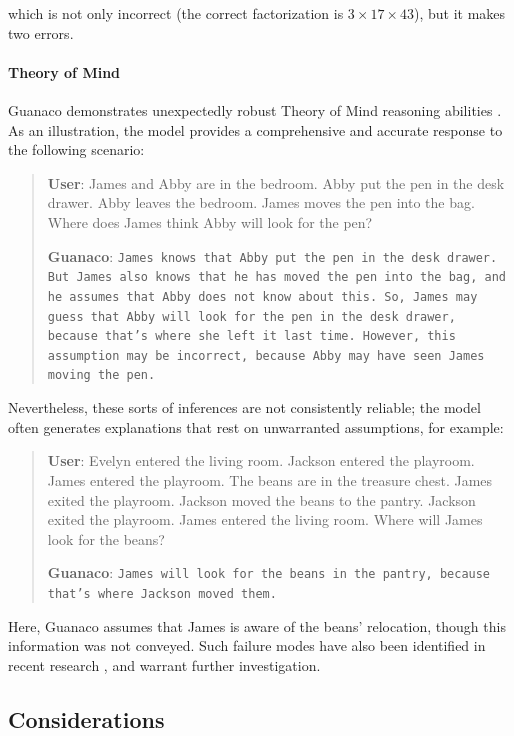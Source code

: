 which is not only incorrect (the correct factorization is $3 \times 17 \times 43$), but it makes two errors.

\paragraph{Theory of Mind} {Guanaco} demonstrates unexpectedly robust Theory of Mind reasoning abilities \cite{nematzadeh2018evaluating, sap2022neural}. As an illustration, the model provides a comprehensive and accurate response to the following scenario:

\begin{quote}
    \textbf{User}: James and Abby are in the bedroom. Abby put the pen in the desk drawer. Abby leaves the bedroom. James moves the pen into the bag. Where does James think Abby will look for the pen?

    \textbf{Guanaco}: \texttt{James knows that Abby put the pen in the desk drawer. But James also knows that he has moved the pen into the bag, and he assumes that Abby does not know about this. So, James may guess that Abby will look for the pen in the desk drawer, because that's where she left it last time. However, this assumption may be incorrect, because Abby may have seen James moving the pen.}
\end{quote}

Nevertheless, these sorts of inferences are not consistently reliable; the model often generates explanations that rest on unwarranted assumptions, for example:

\begin{quote}
    \textbf{User}: Evelyn entered the living room. Jackson entered the playroom. James entered the playroom. The beans are in the treasure chest. James exited the playroom. Jackson moved the beans to the pantry. Jackson exited the playroom. James entered the living room. Where will James look for the beans?

    \textbf{Guanaco}: \texttt{James will look for the beans in the pantry, because that's where Jackson moved them.}
\end{quote}

Here, {Guanaco} assumes that James is aware of the beans’ relocation, though this information was not conveyed. Such failure modes have also been identified in recent research \cite{sap2022neural}, and warrant further investigation.

\subsection{Considerations}
\label{ssec:considerations}

